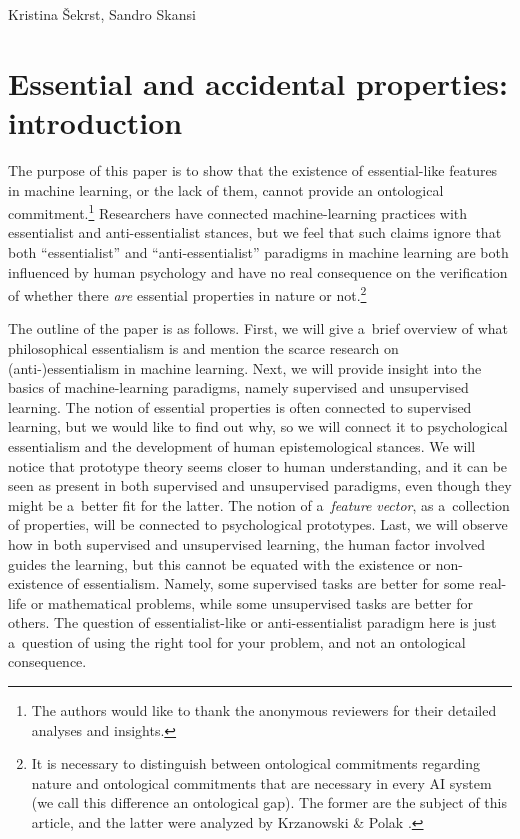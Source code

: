 \begin{artengenv2auth}{Kristina Šekrst, Sandro Skansi}
\section{Essential and accidental properties: introduction}
The purpose of this paper is to show that the existence of essential-like features in machine learning, or the lack of them, cannot provide an ontological commitment.\footnote{The authors would like to thank the anonymous reviewers for their detailed analyses and insights.} Researchers have connected machine-learning practices with essentialist and anti-essentialist stances, but we feel that such claims ignore that both ``essentialist'' and ``anti-essentialist'' paradigms in machine learning are both influenced by human psychology and have no real consequence on the verification of whether there \textit{are} essential properties in nature or not.\footnote{It is necessary to distinguish between ontological commitments regarding nature and ontological commitments that are necessary in every AI system (we call this difference an ontological gap). The former are the subject of this article, and the latter were analyzed by Krzanowski \& Polak
\parencites*[][]{krzanowski_ontology_2022}[][]{krzanowski_meta-ontology_2022}.%
}

The outline of the paper is as follows. First, we will give a~brief overview of what philosophical essentialism is and mention the scarce research on (anti-)essentialism in machine learning. Next, we will provide insight into the basics of machine-learning paradigms, namely supervised and unsupervised learning. The notion of essential properties is often connected to supervised learning, but we would like to find out why, so we will connect it to psychological essentialism and the development of human epistemological stances. We will notice that prototype theory seems closer to human understanding, and it can be seen as present in both supervised and unsupervised paradigms, even though they might be a~better fit for the latter. The notion of a~\textit{feature} \textit{vector}, as a~collection of properties, will be connected to psychological prototypes. Last, we will observe how in both supervised and unsupervised learning, the human factor involved guides the learning, but this cannot be equated with the existence or non-existence of essentialism. Namely, some supervised tasks are better for some real-life or mathematical problems, while some unsupervised tasks are better for others. The question of essentialist-like or anti-essentialist paradigm here is just a~question of using the right tool for your problem, and not an ontological consequence.


\end{artengenv2auth}
